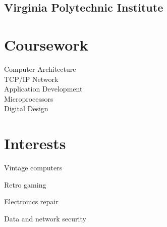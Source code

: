 \documentclass[letterpaper]{deedy-resume-openfont}
\begin{document}
\begin{minipage}[t]{0.27\textwidth}
\subsection{Virginia Polytechnic Institute}


\section{Coursework}
Computer Architecture \\
TCP/IP Network\\
\hspace{3pt} Application Development \\
Microprocessors \\
Digital Design


\section{Interests}
\vspace{\topsep} %

\begin{tightemize}
	\item Vintage computers
	\item Retro gaming
	\item Electronics repair
	\item Data and network security
\end{tightemize}

\end{minipage} %
\hfill
%
\end{document}

